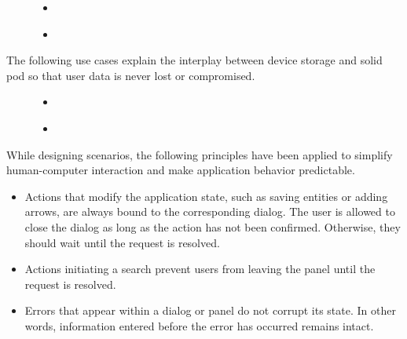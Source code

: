 \begin{figure}[!h]
  \begin{minipage}{0.42\textwidth}
    \begin{itemize}
      \item \emph{}
    \end{itemize}
  \end{minipage}
  \hfill
  \begin{minipage}{0.56\textwidth}
    \begin{itemize}
      \item \emph{}
    \end{itemize}
  \end{minipage}
\end{figure}

The following use cases explain the interplay between device storage and \acs{solid} pod so that user data is never lost or compromised.

\begin{figure}[!h]
  \begin{minipage}{0.42\textwidth}
    \begin{itemize}
      \item \emph{}
    \end{itemize}
  \end{minipage}
  \hfill
  \begin{minipage}{0.56\textwidth}
    \begin{itemize}
      \item \emph{}
    \end{itemize}
  \end{minipage}
\end{figure}

While designing scenarios, the following principles have been applied to simplify human-computer interaction and make application behavior predictable.

\begin{itemize}
\item Actions that modify the application state, such as saving entities or adding arrows, are always bound to the corresponding dialog. The user is allowed to close the dialog as long as the action has not been confirmed. Otherwise, they should wait until the request is resolved.
\item Actions initiating a search prevent users from leaving the panel until the request is resolved.
\item Errors that appear within a dialog or panel do not corrupt its state. In other words, information entered before the error has occurred remains intact.
\end{itemize}

